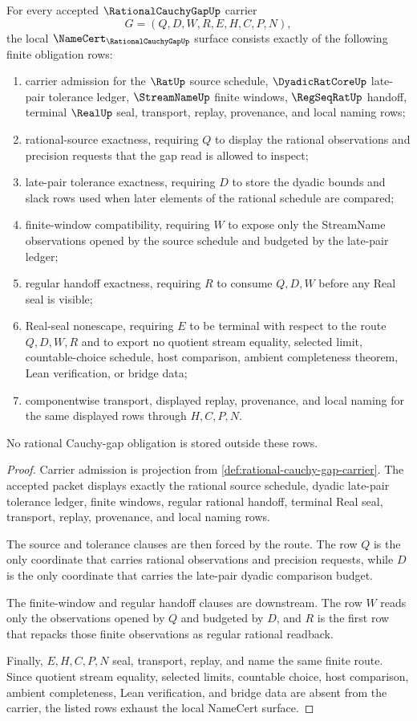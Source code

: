\begin{theorem}
\label{thm:rational-cauchy-gap-namecert-obligations}
For every accepted $\RationalCauchyGapUp$ carrier
$$
G=(Q,D,W,R,E,H,C,P,N),
$$
the local $\NameCert_{\RationalCauchyGapUp}$ surface consists exactly of the following finite obligation rows:
\begin{enumerate}
\item carrier admission for the $\RatUp$ source schedule, $\DyadicRatCoreUp$ late-pair tolerance ledger, $\StreamNameUp$ finite windows, $\RegSeqRatUp$ handoff, terminal $\RealUp$ seal, transport, replay, provenance, and local naming rows;
\item rational-source exactness, requiring $Q$ to display the rational observations and precision requests that the gap read is allowed to inspect;
\item late-pair tolerance exactness, requiring $D$ to store the dyadic bounds and slack rows used when later elements of the rational schedule are compared;
\item finite-window compatibility, requiring $W$ to expose only the StreamName observations opened by the source schedule and budgeted by the late-pair ledger;
\item regular handoff exactness, requiring $R$ to consume $Q,D,W$ before any Real seal is visible;
\item Real-seal nonescape, requiring $E$ to be terminal with respect to the route $Q,D,W,R$ and to export no quotient stream equality, selected limit, countable-choice schedule, host comparison, ambient completeness theorem, Lean verification, or bridge data;
\item componentwise transport, displayed replay, provenance, and local naming for the same displayed rows through $H,C,P,N$.
\end{enumerate}
No rational Cauchy-gap obligation is stored outside these rows.
\end{theorem}
\begin{proof}
Carrier admission is projection from \autoref{def:rational-cauchy-gap-carrier}. The accepted packet displays exactly the rational source schedule, dyadic late-pair tolerance ledger, finite windows, regular rational handoff, terminal Real seal, transport, replay, provenance, and local naming rows.

The source and tolerance clauses are then forced by the route. The row $Q$ is the only coordinate that carries rational observations and precision requests, while $D$ is the only coordinate that carries the late-pair dyadic comparison budget.

The finite-window and regular handoff clauses are downstream. The row $W$ reads only the observations opened by $Q$ and budgeted by $D$, and $R$ is the first row that repacks those finite observations as regular rational readback.

Finally, $E,H,C,P,N$ seal, transport, replay, and name the same finite route. Since quotient stream equality, selected limits, countable choice, host comparison, ambient completeness, Lean verification, and bridge data are absent from the carrier, the listed rows exhaust the local NameCert surface.
\end{proof}


